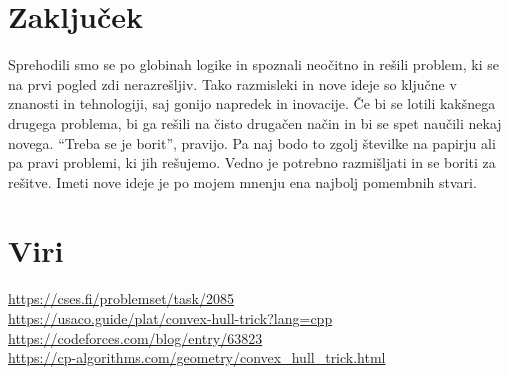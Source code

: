\section{Zaključek}\label{sec:zakljucek}
Sprehodili smo se po globinah logike in spoznali neočitno in rešili problem, ki se na prvi pogled zdi nerazrešljiv.
Tako razmisleki in nove ideje so ključne v znanosti in tehnologiji, saj gonijo napredek in inovacije.
Če bi se lotili kakšnega drugega problema, bi ga rešili na čisto drugačen način in bi se spet naučili nekaj novega.
\textquotedblleft Treba se je borit\textquotedblright, pravijo.
Pa naj bodo to zgolj številke na papirju ali pa pravi problemi, ki jih rešujemo.
Vedno je potrebno razmišljati in se boriti za rešitve.
Imeti nove ideje je po mojem mnenju ena najbolj pomembnih stvari.

\section{Viri}\label{sec:viri}
\href{https://cses.fi/problemset/task/2085}{https://cses.fi/problemset/task/2085}\\
\href{https://usaco.guide/plat/convex-hull-trick?lang=cpp}{https://usaco.guide/plat/convex-hull-trick?lang=cpp}\\
\href{https://codeforces.com/blog/entry/63823}{https://codeforces.com/blog/entry/63823}\\
\href{https://cp-algorithms.com/geometry/convex\_hull\_trick.html}{https://cp-algorithms.com/geometry/convex\_hull\_trick.html}\\
